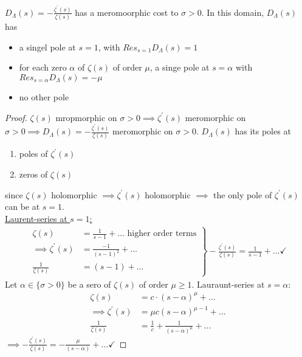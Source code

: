 \documentclass[NumTh.tex]{subfiles}
\begin{document}
\begin{lemma} \label{4_12}
  $D_\Lambda(s) =  - \frac{\zeta^\prime(s)}{\zeta(s)}$ has a meromoorphic cost to $\sigma > 0$.
  In this domain, $D_\Lambda(s)$ has
  \begin{itemize}
    \item a singel pole at $s = 1$, with $Res_{s=1} D_\Lambda(s) = 1$
    \item for each zero $\alpha$ of $\zeta(s)$ of order $\mu$, a singe pole at $s = \alpha$ with $Res_{s=\alpha} D_\Lambda(s) = - \mu$
    \item no other pole
  \end{itemize}
\end{lemma}

\begin{proof}
  $\zeta(s)$ mropmorphic on $\sigma > 0 \implies \zeta^\prime(s)$ meromorphic on $\sigma > 0 \implies D_\Lambda(s) = - \frac{\zeta^\prime(s)}{\zeta(s)}$ meromorphic on $\sigma > 0$.
  $D_\Lambda(s)$ has its poles at
  \begin{enumerate}
    \item poles of $\zeta^\prime(s)$
    \item zeros of $\zeta(s)$
  \end{enumerate}
  since $\zeta(s)$ holomorphic $\implies \zeta^\prime(s)$ holomorphic $\implies$ the only pole of $\zeta^\prime(s)$ can be at $s = 1$.\\
  \underline{Laurent-series at $s=1$:}
  \begin{align*}
    \left.
    \begin{array}{ll}
    \zeta(s) &= \frac{1}{s-1} + \dots \text{ higher order terms} \\
    \implies \zeta^\prime(s) &= \frac{-1}{(s-1)^2} + \dots \\
    \frac{1}{\zeta(s)} &= (s-1) + \dots
    \end{array}
    \right\rbrace -\frac{\zeta^\prime(s)}{\zeta(s)} = \frac{1}{s-1} + \dots \checkmark
  \end{align*}
  Let $\alpha \in \{ \sigma >0\}$ be a sero of $\zeta(s)$ of order $\mu \geq 1$.
  Lauraunt-series at $s = \alpha$:\\
  \begin{align*}
    \zeta(s) &= c \cdot (s- \alpha)^\mu + \dots \\
    \implies \zeta^\prime(s) &= \mu c (s-\alpha)^{\mu - 1} + \dots \\
    \frac{1}{\zeta(s)} &= \frac{1}{c} + \frac{1}{(s-\alpha)^\mu} + \dots
  \end{align*}
  $\implies - \frac{\zeta^\prime(s)}{\zeta(s)} = - \frac{\mu}{(s - \alpha)} + \dots \checkmark$
\end{proof}
\end{document}
